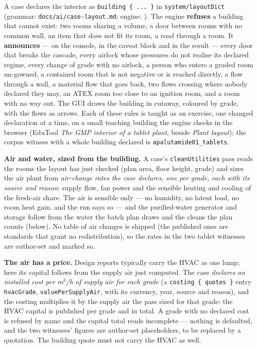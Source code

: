 \documentclass[11pt,a4paper]{article}
\begin{document}
A case declares the interior as \texttt{building \{ ... \}} in
\texttt{system/layoutDict} (grammar: \texttt{docs/ai/case-layout.md};
engine: ). The engine
\textbf{refuses} a building that cannot exist: two rooms sharing a
volume, a door between rooms with no common wall, an item that does not
fit its room, a road through a room. It \textbf{announces} --- on the
console, in the caveat block and in the result --- every door that
breaks the cascade, every airlock whose pressures do not realise its
declared regime, every change of grade with no airlock, a person who
enters a graded room un-gowned, a contained room that is not negative or
is reached directly, a flow through a wall, a material flow that goes
back, two flows crossing where nobody declared they may, an ATEX room
too close to an ignition room, and a room with no way out. The GUI draws
the building in cutaway, coloured by grade, with the flows as arrows.
Each of these rules is taught as an exercise, one changed declaration at a
time, on a small teaching building the engine checks in the browser
(EduTool \emph{The GMP interior of a tablet plant}, beside
\emph{Plant layout}); the corpus witness with a whole building declared is
\texttt{apalutamide01\_tablets}.

\textbf{Air and water, sized from the building.} A case's
\texttt{cleanUtilities} pass reads the rooms the layout has just
checked (plan area, floor height, grade) and sizes the air plant from
\emph{air-change rates the case declares, one per grade, each with its
source and reason}: supply flow, fan power and the sensible heating and
cooling of the fresh-air share. The air is sensible only --- no
humidity, no latent load, no room heat gain, and the run says so ---
and the purified-water generator and storage follow from the water the
batch plan draws and the cleans the plan counts (below). No table of air
changes is shipped (the published ones are standards that grant no
redistribution), so the rates in the two tablet witnesses are
author-set and marked so.

\textbf{The air has a price.} Design reports typically carry the HVAC as
one lump; here its capital follows from the supply air just computed. The
case \emph{declares an installed cost per m$^3$/h of supply air for each
grade} (a \texttt{costing \{ quotes \}} entry \texttt{hvacGrade},
\texttt{valuePerSupplyAir}, with its currency, year, source and reason), and
the costing multiplies it by the supply air the pass sized for that grade:
the HVAC capital is published per grade and in total. A grade with no
declared cost is refused by name and the capital total reads incomplete ---
nothing is defaulted, and the two witnesses' figures are author-set
placeholders, to be replaced by a quotation. The building quote must not
carry the HVAC as well.
\end{document}
